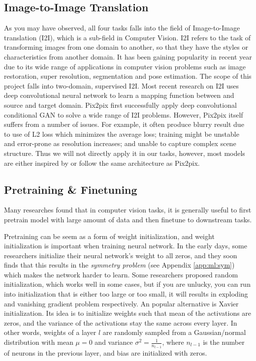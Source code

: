 \subsection{Image-to-Image Translation}
As you may have observed, all four tasks falls into the field of Image-to-Image translation (I2I), which is a sub-field in Computer Vision. I2I refers to the task of transforming images from one domain to another, so that they have the styles or characteristics from another domain. It has been gaining popularity in recent year due to its wide range of applications in computer vision problems such as image restoration, super resolution, segmentation and pose estimation. The scope of this project falls into two-domain, supervised I2I\cite{pangImagetoImageTranslationMethods2021}. Most recent research on I2I uses deep convolutional neural network to learn a mapping function between and source and target domain. Pix2pix\cite{isolaImagetoImageTranslationConditional2018} first successfully apply deep convolutional conditional GAN to solve a wide range of I2I problems. However, Pix2pix itself suffers from a number of issues. For example, it often produce blurry result due to use of L2 loss which minimizes the average loss\cite{wangDiscriminativeRegionProposal2018}; training might be unstable and error-prone as resolution increases\cite{wangHighResolutionImageSynthesis2018}; and unable to capture complex scene structure\cite{tangMultiChannelAttentionSelection2019}. Thus we will not directly apply it in our tasks, however, most models are either inspired by or follow the same architecture as Pix2pix.

\subsection{Pretraining \& Finetuning}
Many researches found that in computer vision tasks, it is generally useful to first pretrain model with large amount of data and then finetune to downstream tasks\cite{baoBEiTBERTPreTraining2021, weiMaskedFeaturePrediction2021, newellHowUsefulSelfSupervised2020}.

Pretraining can be seem as a form of weight initialization, and weight initialization is important when training neural network. In the early days, some researchers initialize their neural network's weight to all zeros, and they soon finds that this results in the \textit{symmetry problem} (see Appendix \ref{app:ml:sym}) which makes the network harder to learn. Some researchers proposed random initialization, which works well in some cases, but if you are unlucky, you can run into initialization that is either too large or too small, it will results in exploding and vanishing gradient problem respectively. An popular alternative is Xavier initialization\cite{glorotUnderstandingDifficultyTraining2010}. Its idea is to initialize weights such that mean of the activations are zeros, and the variance of the activations stay the same across every layer. In other words, weights of a layer $l$ are randomly sampled from a Gaussian/normal distribution with mean $\mu = 0$ and variance $\sigma^2=\frac{1}{n_{l-1}}$, where $n_{l-1}$ is the number of neurons in the previous layer, and bias are initialized with zeros.

